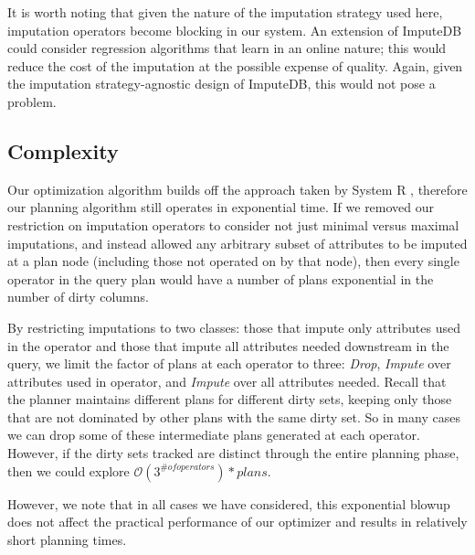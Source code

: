It is worth noting that given the nature of the imputation strategy used here, imputation
operators become blocking in our system. An extension of ImputeDB could consider regression
algorithms that learn in an online nature; this would reduce the cost of the imputation at
the possible expense of quality. Again, given the imputation strategy-agnostic design of
ImputeDB, this would not pose a problem.

\begin{algorithm}
    
\end{algorithm}

\subsection{Complexity}
Our optimization algorithm builds off the approach taken by System R \cite{blasgen1981system}, therefore our planning algorithm still operates in exponential time. 
If we removed our restriction on imputation operators to consider not just minimal versus maximal imputations, and instead allowed any arbitrary subset
of attributes to be imputed at a plan node (including those not operated on by that node), then every single operator in the query plan would have a
number of plans exponential in the number of dirty columns.

By restricting imputations to two classes: those that impute only attributes used in the operator and those that impute all attributes needed downstream in the query,
we limit the factor of plans at each operator to three: \textit{Drop}, \textit{Impute} over attributes used in operator, and \textit{Impute} over all attributes needed.
Recall that the planner maintains different plans for different dirty sets, keeping only those that are not dominated by other plans with the same dirty set. So in many
cases we can drop some of these intermediate plans generated at each operator. However, if the dirty sets tracked are distinct through the entire planning phase,
then we could explore $\mathcal{O}(3^{\# of operators}) * plans$. 

However, we note that in all cases we have considered, this exponential blowup does not affect the practical performance of our optimizer and results in relatively short
planning times.


